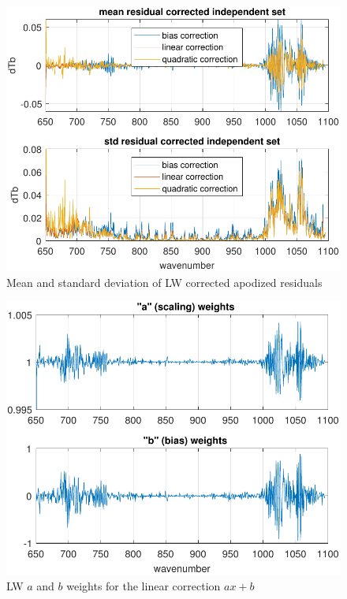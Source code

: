 \documentclass[journal]{IEEEtran}
\begin{document}
\begin{figure} %
  \centering
  \includegraphics[width=\linewidth]{figures/a2cris_regr_LW.pdf}
  \caption{Mean and standard deviation of LW corrected apodized
    residuals}
  \label{statLW}
\end{figure}

\begin{figure} %
  \centering
  \includegraphics[width=\linewidth]{figures/a2cris_coef_LW.pdf}
  \caption{LW $a$ and $b$ weights for the linear correction $ax+b$}
  \label{coefLW}
\end{figure}
\end{document}
